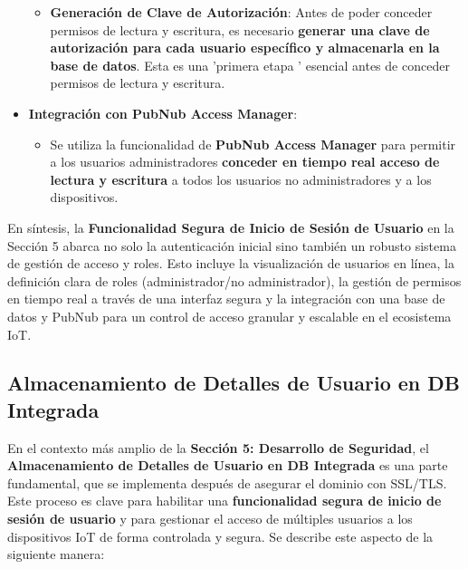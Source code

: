 \documentclass{report}
\begin{document}
\begin{itemize}
\begin{itemize}
\begin{enumerate}
        \end{enumerate}
        \item \textbf{Generación de Clave de Autorización}: Antes de poder conceder permisos de lectura y escritura, es necesario \textbf{generar una 
        clave de autorización para cada usuario específico y almacenarla en la base de datos}. Esta es una  'primera etapa ' esencial antes de conceder 
        permisos de lectura y escritura.
    \end{itemize}
    \item \textbf{Integración con PubNub Access Manager}:
    \begin{itemize}
        \item Se utiliza la funcionalidad de \textbf{PubNub Access Manager} para permitir a los usuarios administradores \textbf{conceder en tiempo real 
        acceso de lectura y escritura} a todos los usuarios no administradores y a los dispositivos.
    \end{itemize}
\end{itemize}
En síntesis, la \textbf{Funcionalidad Segura de Inicio de Sesión de Usuario} en la Sección 5 abarca no solo la autenticación inicial sino también un 
robusto sistema de gestión de acceso y roles. Esto incluye la visualización de usuarios en línea, la definición clara de roles 
(administrador/no administrador), la gestión de permisos en tiempo real a través de una interfaz segura y la integración con una base de datos y 
PubNub para un control de acceso granular y escalable en el ecosistema IoT.

\subsection{Almacenamiento de Detalles de Usuario en DB Integrada}
En el contexto más amplio de la \textbf{Sección 5: Desarrollo de Seguridad}, el \textbf{Almacenamiento de Detalles de Usuario en DB Integrada} 
es una parte fundamental, que se implementa después de asegurar el dominio con SSL/TLS. Este proceso es clave para habilitar una 
\textbf{funcionalidad segura de inicio de sesión de usuario} y para gestionar el acceso de múltiples usuarios a los dispositivos IoT de forma 
controlada y segura. Se describe este aspecto de la siguiente manera:
\end{document}
